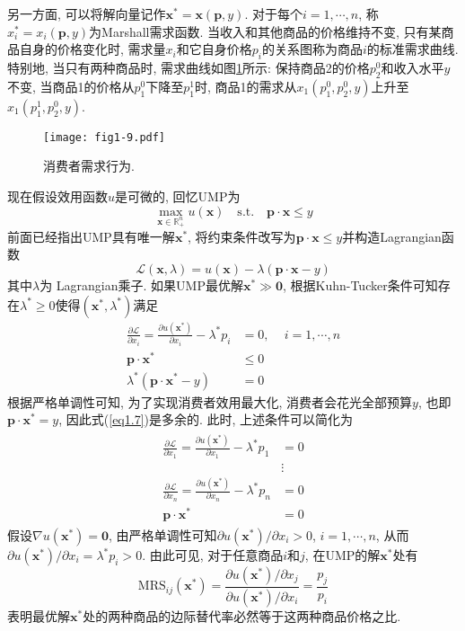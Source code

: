 \documentclass[cn, 12pt, math=mtpro2, bibstyle=apa, blue, twocol]{elegantbook}
\newcommand{\R}{\mathbb{R}}
\newcommand{\p}{\mathbf{p}}
\newcommand{\x}{\mathbf{x}}
\begin{document}
另一方面, 可以将解向量记作$\x^\ast=\x(\p,y)$. 对于每个$i=1,\cdots,n$, 称$x_i^\ast=x_i(\p,y)$为Marshall需求函数. 当收入和其他商品的价格维持不变, 只有某商品自身的价格变化时, 需求量$x_i$和它自身价格$p_i$的关系图称为商品$i$的标准需求曲线. 特别地, 当只有两种商品时, 需求曲线如图\ref{fig1.9}所示: 保持商品2的价格$p_2^0$和收入水平$y$不变, 当商品1的价格从$p_1^0$下降至$p_1^1$时, 商品1的需求从$x_1(p_1^0,p_2^0,y)$上升至$x_1(p_1^1,p_2^0,y)$.
\begin{figure}[htbp!]
  \centering
  \texttt{[image: fig1-9.pdf]}
  \caption{消费者需求行为.}\label{fig1.9}
\end{figure}

现在假设效用函数$u$是可微的, 回忆UMP为
\begin{equation}\label{eq1.4}
  \max_{\x\in\R^n_+} u(\x)\quad \text{s.t.}\quad \p\cdot\x\leq y
\end{equation}
前面已经指出UMP具有唯一解$\x^\ast$, 将约束条件改写为$\p\cdot\x\leq y$并构造Lagrangian函数
$$\mathcal{L}(\x,\lambda)=u(\x)-\lambda(\p\cdot\x-y)$$
其中$\lambda$为 Lagrangian乘子. 如果UMP最优解$\x^\ast\gg\mathbf{0}$, 根据Kuhn-Tucker条件可知存在$\lambda^\ast\ge0$使得$(\x^\ast,\lambda^\ast)$满足
\begin{align}
\frac{\partial\mathcal{L}}{\partial x_i}=\frac{\partial u(\x^\ast)}{\partial x_i}-\lambda^\ast p_i&=0,\,\quad i=1,\cdots, n \label{eq1.5} \\
\p\cdot\x^\ast&\leq 0  \label{eq1.6} \\
\lambda^\ast(\p\cdot\x^\ast-y)&=0 \label{eq1.7}
\end{align}
根据严格单调性可知, 为了实现消费者效用最大化, 消费者会花光全部预算$y$, 也即$\p\cdot\x^\ast=y$, 因此式(\ref{eq1.7})是多余的. 此时, 上述条件可以简化为
\begin{align}
\begin{split}
\frac{\partial\mathcal{L}}{\partial x_1}=\frac{\partial u(\x^\ast)}{\partial x_1}-\lambda^\ast p_1&=0  \\
&\vdots  \\
\frac{\partial\mathcal{L}}{\partial x_n}=\frac{\partial u(\x^\ast)}{\partial x_n}-\lambda^\ast p_n&=0 \\
\p\cdot\x^\ast&=0
\end{split}
\label{eq1.8}
\end{align}
假设$\nabla u(\x^\ast)=\mathbf{0}$, 由严格单调性可知$\partial u(\x^\ast)/\partial x_i>0$, $i=1,\cdots,n$, 从而$\partial u(\x^\ast)/\partial x_i=\lambda^\ast p_i>0$. 由此可见, 对于任意商品$i$和$j$, 在UMP的解$\x^\ast$处有
\begin{equation}\label{eq1.9}
  \text{MRS}_{ij}(\x^\ast)=\frac{\partial u(\x^\ast)/\partial x_j}{\partial u(\x^\ast)/\partial x_i}=\frac{p_j}{p_i}
\end{equation}
表明最优解$\x^\ast$处的两种商品的边际替代率必然等于这两种商品价格之比.
\end{document}
